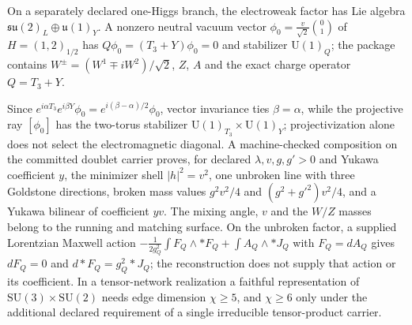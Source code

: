 \documentclass[11pt]{article}
\begin{document}
\begin{corollary}
On a separately declared one-Higgs branch, the electroweak factor has Lie
algebra \(\mathfrak{su}(2)_L\oplus\mathfrak u(1)_Y\). A nonzero neutral vacuum
vector \(\phi_0=\frac{v}{\sqrt2}\binom01\) of \(H=(1,2)_{1/2}\) has
\(Q\phi_0=(T_3+Y)\phi_0=0\) and stabilizer \(\mathrm U(1)_Q\); the package
contains \(W^\pm=(W^1\mp iW^2)/\sqrt2\), \(Z\), \(A\) and the exact charge
operator \(Q=T_3+Y\).
\end{corollary}

Since \(e^{i\alpha T_3}e^{i\beta Y}\phi_0=e^{i(\beta-\alpha)/2}\phi_0\), vector
invariance ties \(\beta=\alpha\), while the projective ray \([\phi_0]\) has the
two-torus stabilizer \(\mathrm U(1)_{T_3}\times\mathrm U(1)_Y\); projectivization
alone does not select the electromagnetic diagonal. A machine-checked
composition on the committed doublet carrier proves, for declared
\(\lambda,v,g,g'>0\) and Yukawa coefficient \(y\), the minimizer shell
\(|h|^2=v^2\), one unbroken line with three Goldstone directions, broken
mass values \(g^2v^2/4\) and \((g^2+g'^2)v^2/4\), and a Yukawa bilinear of
coefficient \(yv\). The mixing angle, \(v\) and the \(W/Z\) masses belong to
the running and matching surface. On the unbroken factor, a supplied
Lorentzian Maxwell action
\(-\frac{1}{2g_Q^2}\int F_Q\wedge*F_Q+\int A_Q\wedge*J_Q\) with
\(F_Q=dA_Q\) gives \(dF_Q=0\) and \(d*F_Q=g_Q^2*J_Q\); the reconstruction does
not supply that action or its coefficient. In a tensor-network realization a
faithful representation of \(\mathrm{SU}(3)\times\mathrm{SU}(2)\) needs edge
dimension \(\chi\ge5\), and \(\chi\ge6\) only under the additional declared
requirement of a single irreducible tensor-product carrier.
\end{document}

